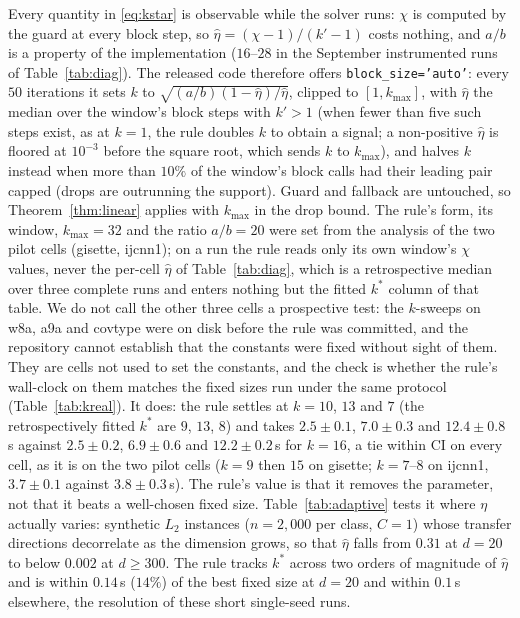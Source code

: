 Every quantity in \eqref{eq:kstar} is observable while the solver runs:
$\chi$ is computed by the guard at every block step, so
$\hat\eta=(\chi-1)/(k'-1)$ costs nothing, and $a/b$ is a property of
the implementation ($16$--$28$ in the September instrumented runs of
Table~\ref{tab:diag}). The released
code therefore offers \texttt{block\_size='auto'}: every $50$ iterations
it sets $k$ to $\sqrt{(a/b)(1-\hat\eta)/\hat\eta}$, clipped to $[1,k_{\max}]$,
with $\hat\eta$ the median over the window's block steps with $k'>1$
(when fewer than five such steps exist, as at $k=1$, the rule doubles
$k$ to obtain a signal; a non-positive $\hat\eta$ is floored at $10^{-3}$
before the square root, which sends $k$ to $k_{\max}$), and halves $k$ instead when
more than $10\%$ of the window's block calls had their leading pair
capped (drops are outrunning the support). Guard and fallback are
untouched, so Theorem~\ref{thm:linear} applies with $k_{\max}$ in the
drop bound. The rule's form, its window, $k_{\max}=32$ and the ratio
$a/b=20$ were set from the analysis of the two pilot cells (gisette,
ijcnn1); on a run the rule reads only its own window's $\chi$ values,
never the per-cell $\hat\eta$ of Table~\ref{tab:diag}, which is a
retrospective median over three complete runs and enters nothing but
the fitted $k^*$ column of that table. We do not call the other three
cells a prospective test: the $k$-sweeps on w8a, a9a and covtype were
on disk before the rule was committed, and the repository cannot
establish that the constants were fixed without sight of them. They
are cells not used to set the constants, and the check is whether the
rule's wall-clock on them matches the fixed sizes run under the same
protocol (Table~\ref{tab:kreal}). It does: the rule settles at $k=10$,
$13$ and $7$ (the retrospectively fitted $k^*$ are $9$, $13$, $8$) and
takes $2.5\pm0.1$, $7.0\pm0.3$ and $12.4\pm0.8$\,s against
$2.5\pm0.2$, $6.9\pm0.6$ and $12.2\pm0.2$\,s for $k{=}16$, a tie
within CI on every cell, as it is on the two pilot cells ($k{=}9$ then
$15$ on gisette; $k{=}7$--$8$ on ijcnn1, $3.7\pm0.1$ against $3.8\pm0.3$\,s). The rule's value is that it removes the parameter,
not that it beats a well-chosen fixed size. Table~\ref{tab:adaptive} tests it where
$\eta$ actually varies: synthetic $L_2$ instances ($n{=}2{,}000$ per
class, $C{=}1$) whose transfer directions decorrelate as the dimension
grows, so that $\hat\eta$ falls from $0.31$ at $d{=}20$ to below
$0.002$ at $d\ge300$. The rule tracks $k^*$ across two orders of
magnitude of $\hat\eta$ and is within $0.14$\,s ($14\%$) of the best
fixed size at $d{=}20$ and within $0.1$\,s elsewhere, the resolution of
these short single-seed runs.

